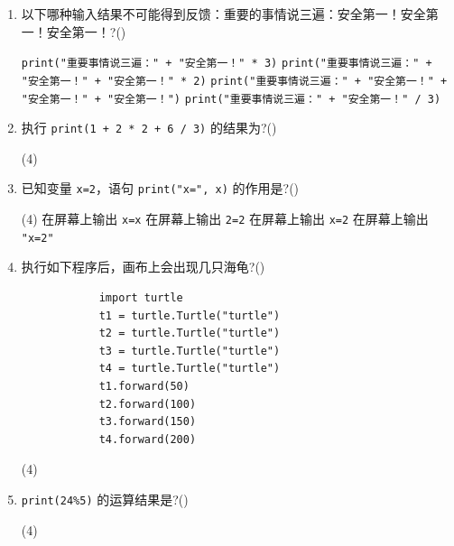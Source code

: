 \documentclass[11pt]{ctexart}
\begin{document}
    \begin{enumerate}
        \item 以下哪种输入结果不可能得到反馈：{\heiti 重要的事情说三遍：安全第一！安全第一！安全第一！}?(\qquad)
        \begin{tasks}
            \task \lstinline{print("重要事情说三遍：" + "安全第一！" * 3)}
            \task \lstinline{print("重要事情说三遍：" + "安全第一！" + "安全第一！" * 2)}
            \task \lstinline{print("重要事情说三遍：" + "安全第一！" + "安全第一！" + "安全第一！")}
            \task \lstinline{print("重要事情说三遍：" + "安全第一！" / 3)}
        \end{tasks}

        \item 执行 \lstinline{print(1 + 2 * 2 + 6 / 3)} 的结果为?(\qquad)
        \begin{tasks}(4)
        \end{tasks}

        \item 已知变量 \lstinline{x=2}，语句 \lstinline{print("x=", x)} 的作用是?(\qquad)
        \begin{tasks}(4)
            \task 在屏幕上输出 \lstinline{x=x}
            \task 在屏幕上输出 \lstinline{2=2}
            \task 在屏幕上输出 \lstinline{x=2}
            \task 在屏幕上输出 \lstinline{"x=2"}
        \end{tasks}

        \item 执行如下程序后，画布上会出现几只海龟?(\qquad)
        \begin{lstlisting}
            import turtle
            t1 = turtle.Turtle("turtle")
            t2 = turtle.Turtle("turtle")
            t3 = turtle.Turtle("turtle")
            t4 = turtle.Turtle("turtle")
            t1.forward(50)
            t2.forward(100)
            t3.forward(150)
            t4.forward(200)
        \end{lstlisting}
        \begin{tasks}(4)
        \end{tasks}

        \item \lstinline{print(24%5)} 的运算结果是?(\qquad)
        \begin{tasks}(4)
        \end{tasks}


\end{enumerate}
\end{document}

